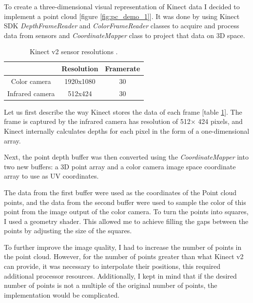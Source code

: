 \documentclass[a4paper]{report}
\begin{document}
 \qquad To create a three-dimensional visual representation of Kinect data I decided to implement a point cloud [figure \ref{fig:pc_demo_1}]. It was done by using Kinect SDK \textit{DepthFrameReader} and \textit{ColorFrameReader} classes to acquire and process data from sensors and \textit{CoordinateMapper} class to project that data on 3D space.
   \begin{table}[H]
   
            \centering
            \begin{tabular}{| c | c | c |} 
                \hline
                                    & Resolution    &   Framerate   \\
                \hline
                Color camera        & 1920x1080     &       30      \\
                \hline
                Infrared camera     & 512x424       &       30      \\
                \hline
            \end{tabular}
            
            \caption{Kinect v2 sensor resolutions \cite{kinctV1V2Comparison}.}
            \label{tab:kinectv2Capabilities}
           
        \end{table}

 \bigskip Let us first describe the way Kinect stores the data of each frame [table \ref{tab:kinectv2Capabilities}]. The frame is captured by the infrared camera has resolution of 512× 424 pixels, and Kinect internally calculates depths for each pixel in the form of a one-dimensional array.
 
 Next, the point depth buffer was then converted using the \textit{CoordinateMapper} into two new buffers: a 3D point array and a color camera image space coordinate array to use as UV coordinates.


The data from the first buffer were used as the coordinates of the Point cloud points, and the data from the second buffer were used to sample the color of this point from the image output of the color camera.
To turn the points into squares, I used a geometry shader. This allowed me to achieve filling the gaps between the points by adjusting the size of the squares.

\bigskip To further improve the image quality, I had to increase the number of points in the point cloud. However, for the number of points greater than what Kinect v2 can provide, it was necessary to interpolate their positions, this required additional processor resources. Additionally, I kept in mind that if the desired number of points is not a multiple of the original number of points, the implementation would be complicated. 
\end{document}
